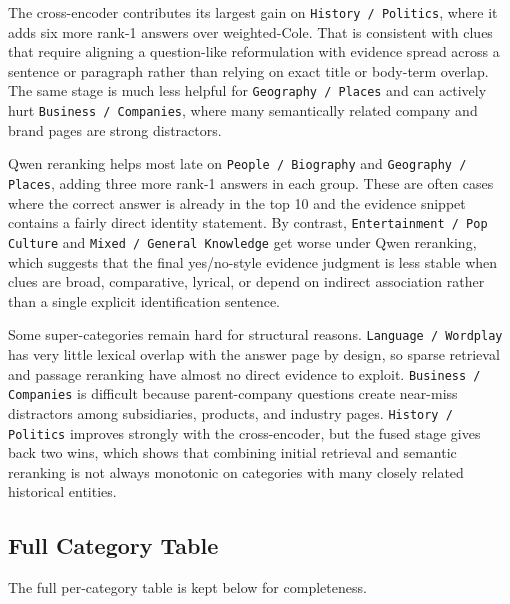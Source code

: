 \documentclass[11pt]{article}
\begin{document}
The cross-encoder contributes its largest gain on \texttt{History / Politics}, where it adds six more rank-1 answers over weighted-Cole. That is consistent with clues that require aligning a question-like reformulation with evidence spread across a sentence or paragraph rather than relying on exact title or body-term overlap. The same stage is much less helpful for \texttt{Geography / Places} and can actively hurt \texttt{Business / Companies}, where many semantically related company and brand pages are strong distractors.

Qwen reranking helps most late on \texttt{People / Biography} and \texttt{Geography / Places}, adding three more rank-1 answers in each group. These are often cases where the correct answer is already in the top 10 and the evidence snippet contains a fairly direct identity statement. By contrast, \texttt{Entertainment / Pop Culture} and \texttt{Mixed / General Knowledge} get worse under Qwen reranking, which suggests that the final yes/no-style evidence judgment is less stable when clues are broad, comparative, lyrical, or depend on indirect association rather than a single explicit identification sentence.

Some super-categories remain hard for structural reasons. \texttt{Language / Wordplay} has very little lexical overlap with the answer page by design, so sparse retrieval and passage reranking have almost no direct evidence to exploit. \texttt{Business / Companies} is difficult because parent-company questions create near-miss distractors among subsidiaries, products, and industry pages. \texttt{History / Politics} improves strongly with the cross-encoder, but the fused stage gives back two wins, which shows that combining initial retrieval and semantic reranking is not always monotonic on categories with many closely related historical entities.

\subsection{Full Category Table}

The full per-category table is kept below for completeness.
\end{document}
